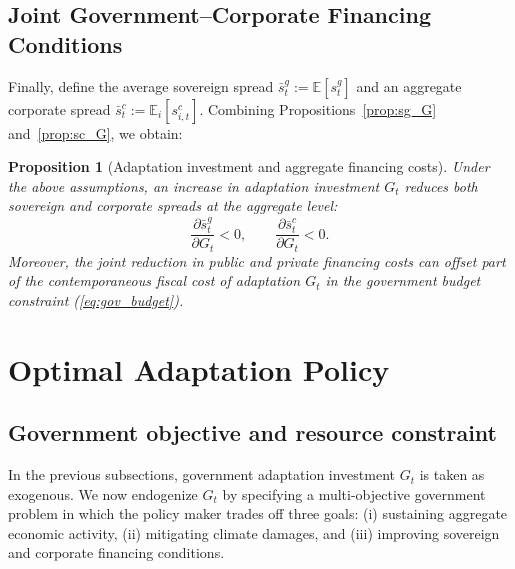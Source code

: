 \documentclass[12pt]{article}
\newtheorem{proposition}{Proposition}
\def\E{\mathbb{E}}
\begin{document}
\subsection{Joint Government--Corporate Financing Conditions}

Finally, define the average sovereign spread
$\bar{s}^g_t := \E[s^g_t]$ and an aggregate corporate spread
$\bar{s}^c_t := \E_i[s^c_{i,t}]$. Combining
Propositions~\ref{prop:sg_G} and~\ref{prop:sc_G}, we obtain:

\begin{proposition}[Adaptation investment and aggregate financing costs]
\label{prop:aggregate_costs}
Under the above assumptions, an increase in adaptation investment $G_t$
reduces both sovereign and corporate spreads at the aggregate level:
\begin{equation}
  \frac{\partial \bar{s}^g_t}{\partial G_t} < 0,
  \qquad
  \frac{\partial \bar{s}^c_t}{\partial G_t} < 0.
\end{equation}
Moreover, the joint reduction in public and private financing costs can
offset part of the contemporaneous fiscal cost of adaptation $G_t$ in the
government budget constraint (\ref{eq:gov_budget}).
\end{proposition}


\section{Optimal Adaptation Policy}
\label{sec:optimal_policy_B}

\subsection{Government objective and resource constraint}
\label{subsec:gov_objective_B}

In the previous subsections, government adaptation investment $G_t$ is taken
as exogenous. We now endogenize $G_t$ by specifying a multi-objective
government problem in which the policy maker trades off three goals:
(i) sustaining aggregate economic activity, (ii) mitigating climate
damages, and (iii) improving sovereign and corporate financing conditions.
\end{document}
